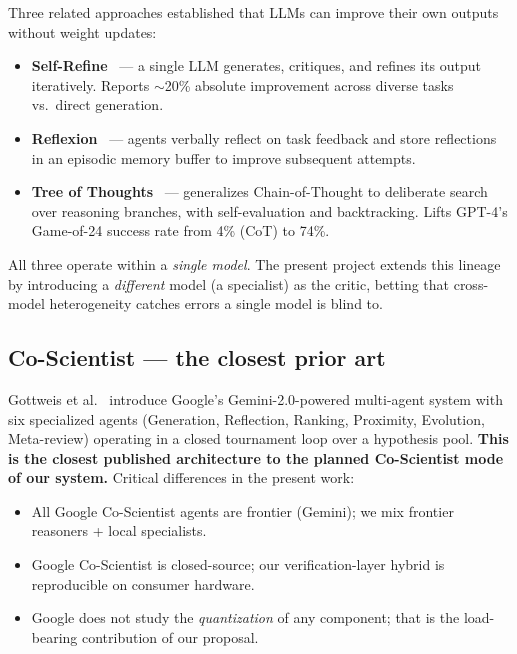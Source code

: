 \documentclass[11pt]{article}
\begin{document}
Three related approaches established that LLMs can improve their own outputs without weight updates:

\begin{itemize}
  \item \textbf{Self-Refine}~\cite{madaan2023selfrefine} --- a single LLM generates, critiques, and refines its output iteratively. Reports $\sim$20\% absolute improvement across diverse tasks vs.\ direct generation.
  \item \textbf{Reflexion}~\cite{shinn2023reflexion} --- agents verbally reflect on task feedback and store reflections in an episodic memory buffer to improve subsequent attempts.
  \item \textbf{Tree of Thoughts}~\cite{yao2023treeofthoughts} --- generalizes Chain-of-Thought to deliberate search over reasoning branches, with self-evaluation and backtracking. Lifts GPT-4's Game-of-24 success rate from 4\% (CoT) to 74\%.
\end{itemize}

All three operate within a \emph{single model}. The present project extends this lineage by introducing a \emph{different} model (a specialist) as the critic, betting that cross-model heterogeneity catches errors a single model is blind to.

\subsection{Co-Scientist --- the closest prior art}

Gottweis et al.~\cite{gottweis2025coscientist} introduce Google's Gemini-2.0-powered multi-agent system with six specialized agents (Generation, Reflection, Ranking, Proximity, Evolution, Meta-review) operating in a closed tournament loop over a hypothesis pool. \textbf{This is the closest published architecture to the planned Co-Scientist mode of our system.} Critical differences in the present work:

\begin{itemize}
  \item All Google Co-Scientist agents are frontier (Gemini); we mix frontier reasoners + local specialists.
  \item Google Co-Scientist is closed-source; our verification-layer hybrid is reproducible on consumer hardware.
  \item Google does not study the \emph{quantization} of any component; that is the load-bearing contribution of our proposal.
\end{itemize}
\end{document}
